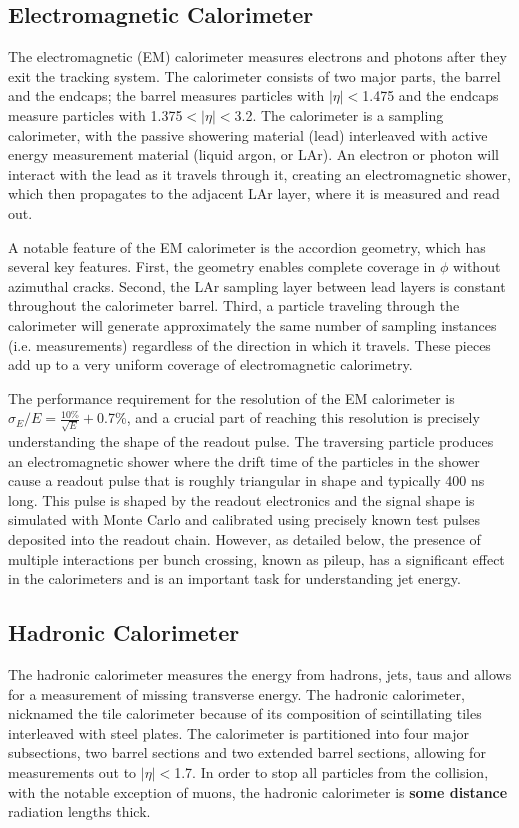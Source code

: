 \subsection{Electromagnetic Calorimeter}
The electromagnetic (EM) calorimeter measures electrons and photons after they exit the tracking system.  The calorimeter consists of two major parts, the barrel and the endcaps; the barrel measures particles with $|\eta|<$1.475 and the endcaps measure particles with 1.375$<|\eta|<$3.2.  The calorimeter is a sampling calorimeter, with the passive showering material (lead) interleaved with active energy measurement material (liquid argon, or LAr).  An electron or photon will interact with the lead as it travels through it, creating an electromagnetic shower, which then propagates to the adjacent LAr layer, where it is measured and read out.

A notable feature of the EM calorimeter is the accordion geometry, which has several key features.  First, the geometry enables complete coverage in $\phi$ without azimuthal cracks.  Second, the LAr sampling layer between lead layers is constant throughout the calorimeter barrel.  Third, a particle traveling through the calorimeter will generate approximately the same number of sampling instances (i.e. measurements) regardless of the direction in which it travels.  These pieces add up to a very uniform coverage of electromagnetic calorimetry.

The performance requirement for the resolution of the EM calorimeter is $\sigma_E/E=\frac{10\%}{\sqrt{E}}+$0.7\%, and a crucial part of reaching this resolution is precisely understanding the shape of the readout pulse.  The traversing particle produces an electromagnetic shower where the drift time of the particles in the shower cause a readout pulse that is roughly triangular in shape and typically 400 ns long.  This pulse is shaped by the readout electronics and the signal shape is simulated with Monte Carlo and calibrated using precisely known test pulses deposited into the readout chain.  However, as detailed below, the presence of multiple interactions per bunch crossing, known as pileup, has a significant effect in the calorimeters and is an important task for understanding jet energy.

\subsection{Hadronic Calorimeter} 
The hadronic calorimeter measures the energy from hadrons, jets, taus and allows for a measurement of missing transverse energy.  The hadronic calorimeter, nicknamed the tile calorimeter because of its composition of scintillating tiles interleaved with steel plates.  The calorimeter is partitioned into four major subsections, two barrel sections and two extended barrel sections, allowing for measurements out to $|\eta|<$1.7.  In order to stop all particles from the collision, with the notable exception of muons, the hadronic calorimeter is \textbf{some distance} radiation lengths thick.




